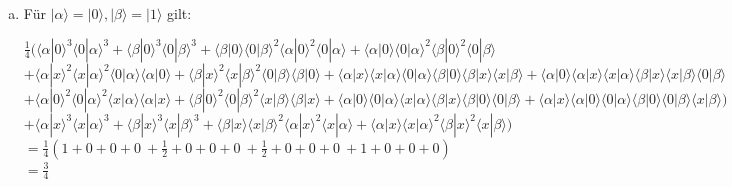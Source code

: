 \documentclass[a4paper]{scrartcl}
\begin{document}
\begin{enumerate}[a)]
\item Für $|\alpha\rangle = |0\rangle,|\beta\rangle = |1\rangle$ gilt: 

$\frac{1}{4} (\langle \alpha|0\rangle^3 \langle 0|\alpha\rangle^3 + \langle \beta|0\rangle^3 \langle 0|\beta\rangle^3 + \langle \beta|0\rangle \langle 0|\beta\rangle^2 \langle \alpha|0\rangle^2 \langle 0|\alpha\rangle + \langle \alpha|0\rangle \langle 0|\alpha\rangle^2 \langle \beta|0\rangle^2 \langle 0|\beta\rangle$\\
$+\langle \alpha|x\rangle^2 \langle x|\alpha\rangle^2\langle 0|\alpha\rangle\langle \alpha|0\rangle + \langle \beta|x\rangle^2 \langle x|\beta\rangle^2\langle 0|\beta\rangle\langle \beta|0\rangle + \langle \alpha|x\rangle \langle x|\alpha\rangle\langle 0|\alpha\rangle  \langle \beta|0\rangle\langle \beta|x\rangle \langle x|\beta\rangle + \langle \alpha|0\rangle\langle \alpha|x\rangle \langle x|\alpha\rangle \langle \beta|x\rangle \langle x|\beta\rangle\langle 0|\beta\rangle$\\
$+\langle \alpha|0\rangle^2 \langle 0|\alpha\rangle^2\langle x|\alpha\rangle\langle \alpha|x\rangle + \langle \beta|0\rangle^2 \langle 0|\beta\rangle^2\langle x|\beta\rangle\langle \beta|x\rangle + \langle \alpha|0\rangle \langle 0|\alpha\rangle\langle x|\alpha\rangle \langle \beta|x\rangle\langle \beta|0\rangle \langle 0|\beta\rangle + \langle \alpha|x\rangle\langle \alpha|0\rangle \langle 0|\alpha\rangle \langle \beta|0\rangle \langle 0|\beta\rangle\langle x|\beta\rangle)$\\
$+\langle \alpha|x\rangle^3 \langle x|\alpha\rangle^3 + \langle \beta|x\rangle^3 \langle x|\beta\rangle^3 + \langle \beta|x\rangle \langle x|\beta\rangle^2 \langle \alpha|x\rangle^2 \langle x|\alpha\rangle + \langle \alpha|x\rangle \langle x|\alpha\rangle^2 \langle \beta|x\rangle^2 \langle x|\beta\rangle)$\\
$=\frac{1}{4}(1+0+0+0~+\frac{1}{2}+0+0+0~+\frac{1}{2}+0+0+0~+1+0+0+0)$\\
$=\frac{3}{4}$
\end{enumerate}
\end{document}

